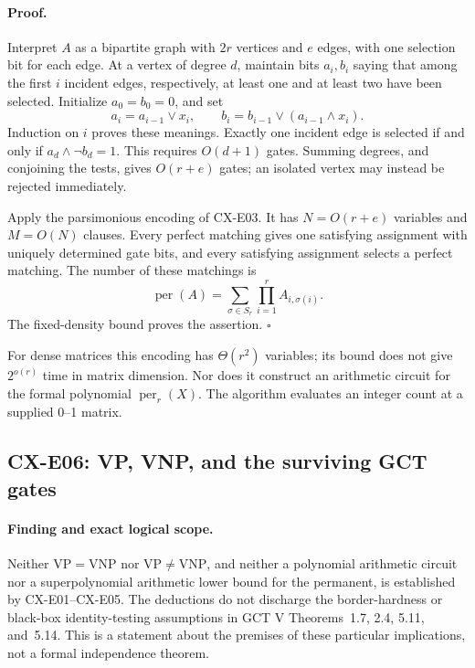 \paragraph{Proof.}
Interpret \(A\) as a bipartite graph with \(2r\) vertices and \(e\)
edges, with one selection bit for each edge.
At a vertex of degree \(d\), maintain bits \(a_i,b_i\) saying that
among the first \(i\) incident edges, respectively, at least one and
at least two have been selected. Initialize \(a_0=b_0=0\), and set
\[
 a_i=a_{i-1}\vee x_i,\qquad
 b_i=b_{i-1}\vee(a_{i-1}\wedge x_i).
\]
Induction on \(i\) proves these meanings.
Exactly one incident edge is selected if and only if
\(a_d\wedge\neg b_d=1\).
This requires \(O(d+1)\) gates.
Summing degrees, and conjoining the tests, gives \(O(r+e)\) gates;
an isolated vertex may instead be rejected immediately.

Apply the parsimonious encoding of CX-E03.
It has \(N=O(r+e)\) variables and \(M=O(N)\) clauses.
Every perfect matching gives one satisfying assignment with uniquely
determined gate bits, and every satisfying assignment selects a
perfect matching.
The number of these matchings is
\[
 \operatorname{per}(A)=
 \sum_{\sigma\in S_r}\prod_{i=1}^r A_{i,\sigma(i)}.
\]
The fixed-density bound proves the assertion.
\hfill\(\square\)

For dense matrices this encoding has \(\Theta(r^2)\) variables; its
bound does not give \(2^{o(r)}\) time in matrix dimension.
Nor does it construct an arithmetic circuit for the formal
polynomial \(\operatorname{per}_r(X)\).
The algorithm evaluates an integer count at a supplied 0--1 matrix.

\subsection{CX-E06: VP, VNP, and the surviving GCT gates}
\label{finding:CX-E06}

\paragraph{Finding and exact logical scope.}
Neither \(\mathrm{VP}=\mathrm{VNP}\) nor
\(\mathrm{VP}\ne\mathrm{VNP}\), and neither a polynomial arithmetic
circuit nor a superpolynomial arithmetic lower bound for the
permanent, is established by CX-E01--CX-E05.
The deductions do not discharge the border-hardness or black-box
identity-testing assumptions in GCT V Theorems~1.7, 2.4, 5.11,
and~5.14. This is a statement about the premises of these particular
implications, not a formal independence theorem.

